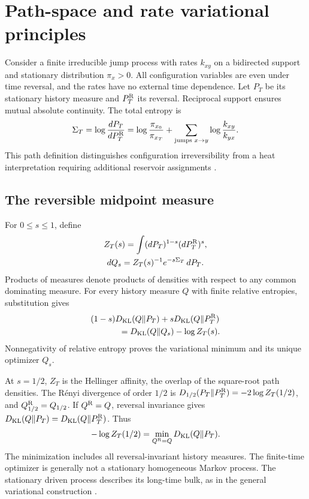 \documentclass[aps,pre,reprint,amsmath,amssymb,longbibliography,floatfix]{revtex4-2}
\newcommand{\KL}{D_{\mathrm{KL}}}
\begin{document}
\appendix
\section{Path-space and rate variational principles}
\label{app:information}

Consider a finite irreducible jump process with rates $k_{xy}$ on a
bidirected support and stationary distribution $\pi_x>0$. All
configuration variables are even under time reversal, and the rates
have no external time dependence. Let $P_T$ be its stationary
history measure and $P_T^{\rm R}$ its reversal. Reciprocal
support ensures mutual absolute continuity. The total entropy is
\begin{equation}
 \Sigma_T=\log\frac{dP_T}{dP_T^{\rm R}}
 =\log\frac{\pi_{x_0}}{\pi_{x_T}}
   +\sum_{\text{jumps }x\to y}\log\frac{k_{xy}}{k_{yx}}.
 \label{eq:app-total-entropy}
\end{equation}
This path definition distinguishes configuration irreversibility from
a heat interpretation requiring additional reservoir assignments
\cite{RoldanParrondo2012}.

\subsection{The reversible midpoint measure}
\label{app:path-midpoint}

For $0\le s\le1$, define
\begin{equation}
 \begin{gathered}
 Z_T(s)=\int(dP_T)^{1-s}(dP_T^{\rm R})^s,\\
 dQ_s=Z_T(s)^{-1}e^{-s\Sigma_T}\,dP_T.
 \end{gathered}
 \label{eq:app-geometric-path}
\end{equation}
Products of measures denote products of densities with respect to
any common dominating measure. For every history measure $Q$
with finite relative entropies, substitution gives
\begin{align}
 &(1-s)\KL(Q\Vert P_T)
       +s\KL(Q\Vert P_T^{\rm R})
 \nonumber\\
 &\hspace{12mm}
 =\KL(Q\Vert Q_s)-\log Z_T(s).
 \label{eq:app-kl-completion}
\end{align}
Nonnegativity of relative entropy proves the variational minimum and
its unique optimizer $Q_s$.

At $s=1/2$, $Z_T$ is the Hellinger affinity, the overlap of the square-root path densities. The R\'enyi divergence of order $1/2$ is
$D_{1/2}(P_T\Vert P_T^{\rm R})=-2\log Z_T(1/2)$,
and $Q_{1/2}^{\rm R}=Q_{1/2}$. If
$Q^{\rm R}=Q$, reversal invariance gives
$\KL(Q\Vert P_T)
 =\KL(Q\Vert P_T^{\rm R})$. Thus
\begin{equation}
 -\log Z_T(1/2)
 =\min_{Q^{\rm R}=Q}
      \KL(Q\Vert P_T).
 \label{eq:app-reversible-projection}
\end{equation}
The minimization includes all reversal-invariant history measures.
The finite-time optimizer is generally not a stationary homogeneous
Markov process. The stationary driven process describes its long-time
bulk, as in the general variational construction
\cite{ChetriteTouchetteControl2015}.
\end{document}
